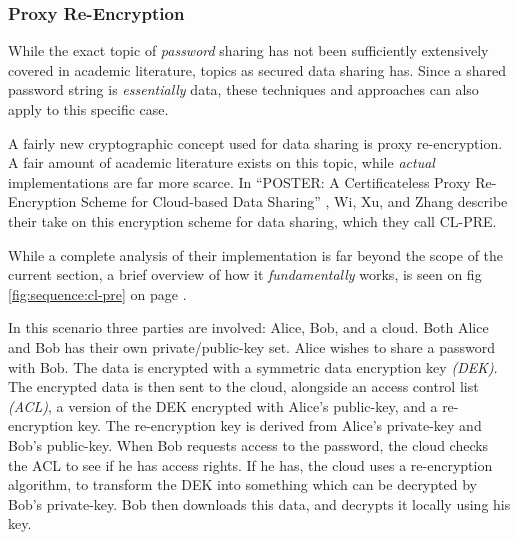 			\subsubsection{Proxy Re-Encryption}
				While the exact topic of \emph{password} sharing has not been sufficiently extensively covered in academic literature, topics as secured data sharing has. Since a shared password string is \emph{essentially} data, these techniques and approaches can also apply to this specific case. 

				A fairly new cryptographic concept used for data sharing is proxy re-encryption. A fair amount of academic literature exists on this topic, while \emph{actual} implementations are far more scarce. In ``POSTER: A Certificateless Proxy Re-Encryption Scheme for Cloud-based Data Sharing'' \cite{Wu:2011:PCP:2046707.2093514}, Wi, Xu, and Zhang describe their take on this encryption scheme for data sharing, which they call CL-PRE.

				While a complete analysis of their implementation is far beyond the scope of the current section, a brief overview of how it \emph{fundamentally} works, is seen on fig \ref{fig:sequence:cl-pre} on page \pageref{fig:sequence:cl-pre}.

				In this scenario three parties are involved: Alice, Bob, and a cloud. Both Alice and Bob has their own private/public-key set. Alice wishes to share a password with Bob. The data is encrypted with a symmetric data encryption key \emph{(DEK)}. The encrypted data is then sent to the cloud, alongside an access control list \emph{(ACL)}, a version of the DEK encrypted with Alice's public-key, and a re-encryption key. The re-encryption key is derived from Alice's private-key and Bob's public-key. When Bob requests access to the password, the cloud checks the ACL to see if he has access rights. If he has, the cloud uses a re-encryption algorithm, to transform the DEK into something which can be decrypted by Bob's private-key. Bob then downloads this data, and decrypts it locally using his key.


